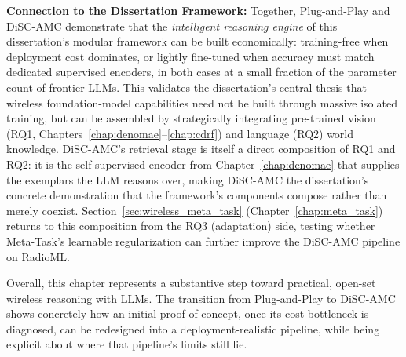\textbf{Connection to the Dissertation Framework:} Together, Plug-and-Play and DiSC-AMC demonstrate that the \textit{intelligent reasoning engine} of this dissertation's modular framework can be built economically: training-free when deployment cost dominates, or lightly fine-tuned when accuracy must match dedicated supervised encoders, in both cases at a small fraction of the parameter count of frontier LLMs. This validates the dissertation's central thesis that wireless foundation-model capabilities need not be built through massive isolated training, but can be assembled by strategically integrating pre-trained vision (RQ1, Chapters~\ref{chap:denomae}--\ref{chap:cdrf}) and language (RQ2) world knowledge. DiSC-AMC's retrieval stage is itself a direct composition of RQ1 and RQ2: it is the self-supervised encoder from Chapter~\ref{chap:denomae} that supplies the exemplars the LLM reasons over, making DiSC-AMC the dissertation's concrete demonstration that the framework's components compose rather than merely coexist. Section~\ref{sec:wireless_meta_task} (Chapter~\ref{chap:meta_task}) returns to this composition from the RQ3 (adaptation) side, testing whether Meta-Task's learnable regularization can further improve the DiSC-AMC pipeline on RadioML.

Overall, this chapter represents a substantive step toward practical, open-set wireless reasoning with LLMs. The transition from Plug-and-Play to DiSC-AMC shows concretely how an initial proof-of-concept, once its cost bottleneck is diagnosed, can be redesigned into a deployment-realistic pipeline, while being explicit about where that pipeline's limits still lie.

\FloatBarrier

% 
% 

